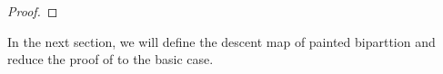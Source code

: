 \documentclass[12pt,a4paper]{amsart}
\def\PPm{\wp_{\downarrow}}
\def\uptaum{\uptau_{\downarrow}}
\numberwithin{equation}{section}
\theoremstyle{remark}
\newcommand{\BOX}[1]{\mathrm{Box}(#1)}
\begin{document}
\begin{proof}

\end{proof}

In the next section, we will define the descent map of painted biparttion and reduce the proof of
 to the basic case.
\end{document}
